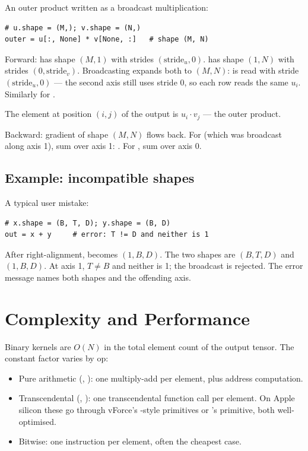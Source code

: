 An outer product written as a broadcast multiplication:

\begin{lstlisting}[style=lucid,language=LucidPython]
# u.shape = (M,); v.shape = (N,)
outer = u[:, None] * v[None, :]   # shape (M, N)
\end{lstlisting}

Forward:  has shape $(M, 1)$ with strides
$(\text{stride}_u, 0)$.  has shape $(1, N)$ with
strides $(0, \text{stride}_v)$. Broadcasting expands both to
$(M, N)$:  is read with stride $(\text{stride}_u, 0)$ ---
the second axis still uses stride 0, so each row reads the same
$u_i$. Similarly for .

The element at position $(i, j)$ of the output is $u_i \cdot v_j$
--- the outer product.

Backward: gradient  of shape $(M, N)$ flows back.
For  (which was broadcast along axis 1), sum over axis 1:
. For , sum over
axis 0.

\subsection{Example: incompatible shapes}
\label{ssec:binary_functions:incompat_example}

A typical user mistake:

\begin{lstlisting}[style=lucid,language=LucidPython]
# x.shape = (B, T, D); y.shape = (B, D)
out = x + y     # error: T != D and neither is 1
\end{lstlisting}

After right-alignment,  becomes $(1, B, D)$. The two
shapes are $(B, T, D)$ and $(1, B, D)$. At axis 1, $T \neq B$ and
neither is 1; the broadcast is rejected. The error message names
both shapes and the offending axis.

\section{Complexity and Performance}
\label{sec:binary_functions:complexity}

Binary kernels are $O(N)$ in the total element count of the output
tensor. The constant factor varies by op:

\begin{itemize}
  \item Pure arithmetic (, ): one
    multiply-add per element, plus address computation.
  \item Transcendental (, ): one
    transcendental function call per element. On Apple silicon
    these go through vForce's -style primitives or
    \MLX's  primitive, both well-optimised.
  \item Bitwise: one instruction per element, often the cheapest
    case.
\end{itemize}

